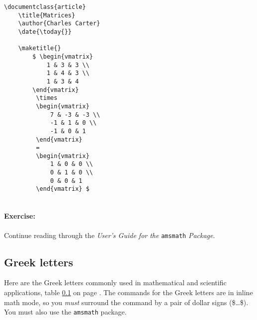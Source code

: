         \begin{verbatim}
\documentclass{article}
    \title{Matrices}
    \author{Charles Carter}
    \date{\today{}}
 
    \maketitle{}
        $ \begin{vmatrix}
            1 & 3 & 3 \\
            1 & 4 & 3 \\
            1 & 3 & 4 
        \end{vmatrix}
         \times 
         \begin{vmatrix}
             7 & -3 & -3 \\
             -1 & 1 & 0 \\
             -1 & 0 & 1
         \end{vmatrix}
         =
         \begin{vmatrix}
             1 & 0 & 0 \\
             0 & 1 & 0 \\
             0 & 0 & 1
         \end{vmatrix} $
    
        \end{verbatim}

		\paragraph{Exercise:}Continue reading through the \textit{User's Guide for the }\texttt{amsmath} \textit{Package}.

        \subsection{Greek letters}
        \label{Greek letters}
        

        Here are the Greek letters commonly used in mathematical and scientific applications, table \ref{Greek letters} on page \pageref{Greek letters}. The \Lx{} commands for the Greek letters are in inline math mode, so you \textit{must} surround the command by a pair of dollar signs (\$\ldots\$). You must also use the \texttt{amsmath} package.

